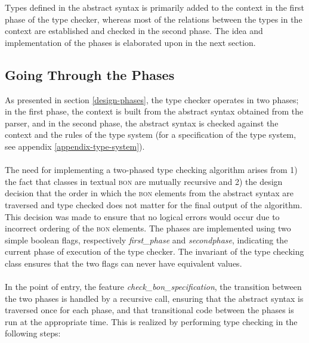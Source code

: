 Types defined in the abstract syntax is primarily added to the context in the first phase of the type checker, whereas most of the relations between the types in the context are established and checked in the second phase. The idea and implementation of the phases is elaborated upon in the next section.

\subsection{Going Through the Phases}
\label{implementation-phases}
As presented in section \ref{design-phases}, the type checker operates in two phases; in the first phase, the context is built from the abstract syntax obtained from the parser, and in the second phase, the abstract syntax is checked against the context and the rules of the type system (for a specification of the type system, see appendix \ref{appendix-type-system}).
\paragraph{} %
The need for implementing a two-phased type checking algorithm arises from 1) the fact that classes in textual \textsc{bon} are mutually recursive and 2) the design decision that the order in which the \textsc{bon} elements from the abstract syntax are traversed and type checked does not matter for the final output of the algorithm. This decision was made to ensure that no logical errors would occur due to incorrect ordering of the \textsc{bon} elements.
The phases are implemented using two simple boolean flags, respectively \textit{first\_phase} and \textit{second\textunderscore phase}, indicating the current phase of execution of the type checker. The invariant of the type checking class ensures that the two flags can never have equivalent values.

\paragraph{}
In the point of entry, the feature \textit{check\_bon\_specification}, the transition between the two phases is handled by a recursive call, ensuring that the abstract syntax is traversed once for each phase, and that transitional code between the phases is run at the appropriate time. This is realized by performing type checking in the following steps:

